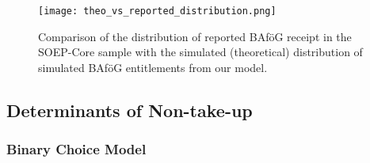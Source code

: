 \begin{figure}[htbp]
  \centering
  \texttt{[image: theo\_vs\_reported\_distribution.png]}
  \caption{Comparison of the distribution of reported BAföG receipt in the SOEP-Core sample with the simulated (theoretical) distribution of simulated BAföG entitlements from our model.}
  \label{fig:theo-vs-reported}
\end{figure}

\subsection{Determinants of Non-take-up}
\subsubsection{Binary Choice Model}

